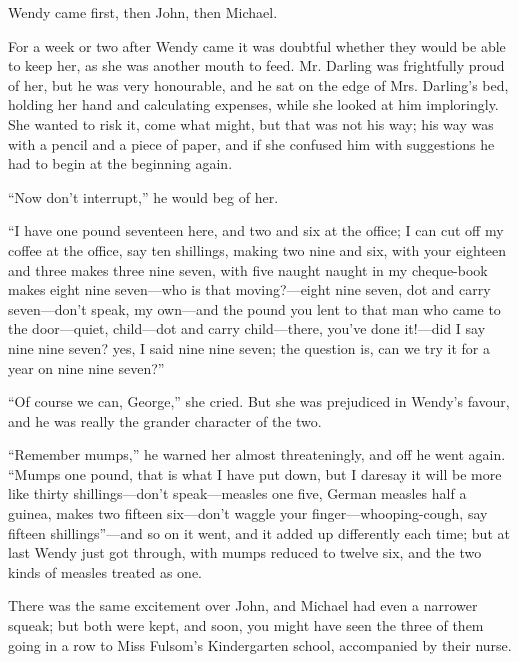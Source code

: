Wendy came first, then John, then Michael.

For a week or two after Wendy came it was doubtful whether they would be able
to keep her, as she was another mouth to feed.
Mr. Darling was frightfully proud of her, but he was very honourable, and he
sat on the edge of Mrs. Darling's bed, holding her hand and calculating
expenses, while she looked at him imploringly.
She wanted to risk it, come what might, but that was not his way; his way was
with a pencil and a piece of paper, and if she confused him with suggestions he
had to begin at the beginning again.

``Now don't interrupt,'' he would beg of her.

``I have one pound seventeen here, and two and six at the office; I can cut off
my coffee at the office, say ten shillings, making two nine and six, with your
eighteen and three makes three nine seven, with five naught naught in my
cheque-book makes eight nine seven---who is that moving?---eight nine seven,
dot and carry seven---don't speak, my own---and the pound you lent to that man
who came to the door---quiet, child---dot and carry child---there, you've done
it!---did I say nine nine seven? yes, I said nine nine seven; the question is,
can we try it for a year on nine nine seven?''

``Of course we can, George,'' she cried. But she was prejudiced in
Wendy's favour, and he was really the grander character of the two.

``Remember mumps,'' he warned her almost threateningly, and off he went
again. ``Mumps one pound, that is what I have put down, but I daresay it
will be more like thirty shillings---don't speak---measles one five, German
measles half a guinea, makes two fifteen six---don't waggle your
finger---whooping-cough, say fifteen shillings''---and so on it went, and it
added up differently each time; but at last Wendy just got through,
with mumps reduced to twelve six, and the two kinds of measles treated
as one.

There was the same excitement over John, and Michael had even a
narrower squeak; but both were kept, and soon, you might have seen the
three of them going in a row to Miss Fulsom's Kindergarten school,
accompanied by their nurse.

